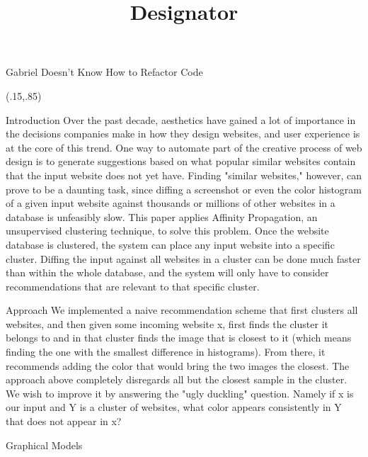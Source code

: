 \documentclass{beamer}
\title[Designator]{Designator}
\newcommand{\N}{\mathcal{N}}
\begin{document}
\begin{frame}{\centerline{\Huge Gabriel Doesn't Know How to Refactor Code}}
\begin{textblock}{5}(.15,.85)
\begin{block}{Introduction}
Over the past decade, aesthetics have gained a lot of importance in the decisions companies
make in how they design websites, and user experience is at the core of this trend. One way to
automate part of the creative process of web design is to generate suggestions based on what
popular similar websites contain that the input website does not yet have. Finding "similar
websites," however, can prove to be a daunting task, since diffing a screenshot or even the
color histogram of a given input website against thousands or millions of other websites in a
database is unfeasibly slow. This paper applies Affinity Propagation, an unsupervised clustering
technique, to solve this problem. Once the website database is clustered, the system can place
any input website into a specific cluster. Diffing the input against all websites in a cluster can be
done much faster than within the whole database, and the system will only have to consider
recommendations that are relevant to that specific cluster. 
\end{block}

\begin{block}{Approach}
We implemented a naive recommendation scheme that first clusters all websites, and then
given some incoming website x, first finds the cluster it belongs to and in that cluster finds the
image that is closest to it (which means finding the one with the smallest difference in
histograms). From there, it recommends adding the color that would bring the two images the
closest.
The approach above completely disregards all but the closest sample in the cluster. We wish to
improve it by answering the "ugly duckling" question. Namely if x is our input and Y is a cluster
of websites, what color appears consistently in Y that does not appear in x?
\end{block}

\begin{block}{Graphical Models}
\begin{figure}
\centering
{}
\end{figure}
\end{block}



\end{textblock}
\end{frame}
\end{document}
